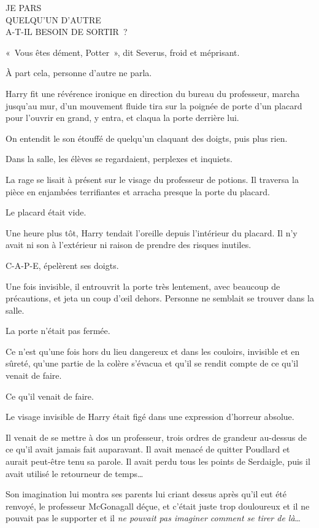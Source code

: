 \medskip
\begin{writtenNote}%
JE PARS\\
QUELQU'UN D'AUTRE\\
A-T-IL BESOIN DE SORTIR~?
\end{writtenNote}%

«~Vous êtes dément, Potter~», dit Severus, froid et méprisant.

À part cela, personne d'autre ne parla.

Harry fit une révérence ironique en direction du bureau du professeur, marcha jusqu'au mur, d'un mouvement fluide tira sur la poignée de porte d'un placard pour l'ouvrir en grand, y entra, et claqua la porte derrière lui.

On entendit le son étouffé de quelqu'un claquant des doigts, puis plus rien.

Dans la salle, les élèves se regardaient, perplexes et inquiets.

La rage se lisait à présent sur le visage du professeur de potions.
Il traversa la pièce en enjambées terrifiantes et arracha presque la porte du placard.

Le placard était vide.

\later

Une heure plus tôt, Harry tendait l'oreille depuis l'intérieur du placard.
Il n'y avait ni son à l'extérieur ni raison de prendre des risques inutiles.

C-A-P-E, épelèrent ses doigts.

Une fois invisible, il entrouvrit la porte très lentement, avec beaucoup de précautions, et jeta un coup d'œil dehors.
Personne ne semblait se trouver dans la salle.

La porte n'était pas fermée.

Ce n'est qu'une fois hors du lieu dangereux et dans les couloirs, invisible et en sûreté, qu'une partie de la colère s'évacua et qu'il se rendit compte de ce qu'il venait de faire.

Ce qu'il venait de faire.

Le visage invisible de Harry était figé dans une expression d'horreur absolue.

Il venait de se mettre à dos un professeur, trois ordres de grandeur au-dessus de ce qu'il avait jamais fait auparavant.
Il avait menacé de quitter Poudlard et aurait peut-être tenu sa parole.
Il avait perdu tous les points de Serdaigle, puis il avait utilisé le retourneur de temps…

Son imagination lui montra ses parents lui criant dessus après qu'il eut été renvoyé, le professeur McGonagall déçue, et c'était juste trop douloureux et il ne pouvait pas le supporter et il \emph{ne pouvait pas imaginer comment se tirer de là}…

